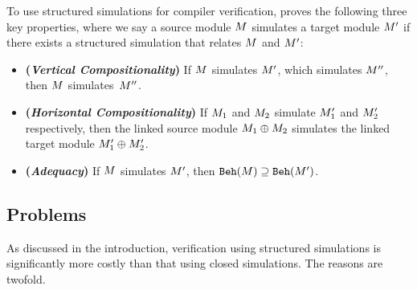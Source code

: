 To use structured simulations for compiler verification, \ccc{} proves
the following three key properties, where we say a source module
$M$ simulates a target module $M'$ if there exists a
structured simulation that relates $M$ and $M'$:
\begin{itemize}
\item \textbf{(\emph{Vertical Compositionality})}
  If $M$ simulates $M'$, which simulates $M''$,
  then $M$ simulates~$M''$.
\item \textbf{(\emph{Horizontal Compositionality})}
  If $M_1$ and $M_2$ simulate
     $M'_1$ and $M'_2$ respectively,
  then the linked source module  $M_1 \oplus M_2$ simulates
  the linked target module $M'_1 \oplus M'_2$.
\item \textbf{(\emph{Adequacy})}
  If $M$ simulates $M'$,
  then $\mathtt{Beh}({M}) \supseteq \mathtt{Beh}({M'})$.
\end{itemize}

\subsection{Problems}
\label{sec:overview-verification:problems}
%
%
%

As discussed in the introduction, verification using structured
simulations is significantly more costly than that using closed
simulations.  The reasons are twofold.

